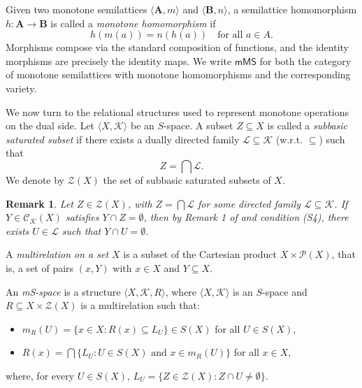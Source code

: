 \documentclass{article}
\newtheorem{remark}{\bf Remark}[section]
\begin{document}
\medskip

Given two monotone semilattices $\langle\mathbf{A}, m\rangle$ and $\langle\mathbf{B}, n\rangle$, a semilattice homomorphism $h \colon \mathbf{A} \to \mathbf{B}$ is called a \emph{monotone homomorphism} if
\[
h(m(a)) = n(h(a)) \quad \text{for all } a \in A.
\]
Morphisms compose via the standard composition of functions, and the identity morphisms are precisely the identity maps. We write $\mathsf{mMS}$ for both the category of monotone semilattices with monotone homomorphisms and the corresponding variety.

\medskip

We now turn to the relational structures used to represent monotone operations on the dual side. Let $\langle X,\mathcal{K} \rangle$ be an $S$-space. A subset $Z \subseteq X$ is called a \emph{subbasic saturated subset} if there exists a dually directed family $\mathcal{L} \subseteq \mathcal{K}$ (w.r.t. $\subseteq$) such that
\[
Z = \bigcap \mathcal{L}.
\]
We denote by $\mathcal{Z}(X)$ the set of subbasic saturated subsets of $X$.

\begin{remark}\label{rem: Remark1 CMZ}
    Let $Z\in \mathcal{Z}(X)$, with $Z=\bigcap\mathcal{L}$ for some directed family $\mathcal{L}\subseteq \mathcal{K}$. If $Y\in \mathcal{C}_{\mathcal{K}}(X)$ satisfies $Y\cap Z=\emptyset$, then by Remark 1 of \cite{P W} and condition (S4), there exists $U\in \mathcal{L}$ such that $Y\cap U=\emptyset$.
\end{remark}

A \emph{multirelation on a set $X$} is a subset of the Cartesian product $X \times \mathcal{P}(X)$, that is, a set of pairs $(x,Y)$ with $x \in X$ and $Y \subseteq X$.

\medskip

An \emph{mS-space} is a structure $\langle X, \mathcal{K}, R \rangle$, where $\langle X, \mathcal{K} \rangle$ is an $S$-space and $R \subseteq X \times \mathcal{Z}(X)$ is a multirelation such that:
\begin{itemize}
    \item[(m1)] $m_R(U) = \{ x \in X : R(x)\subseteq L_{U} \} \in S(X)$ for all $U \in S(X)$,
    \item[(m2)] $R(x) = \bigcap\{ L_U : U \in S(X) \text{ and } x \in m_R(U) \}$ for all $x \in X$,
\end{itemize}
where, for every $U \in S(X)$, $L_{U} = \{ Z \in \mathcal{Z}(X) \colon Z \cap U \neq \emptyset \}$.

\medskip
\end{document}
